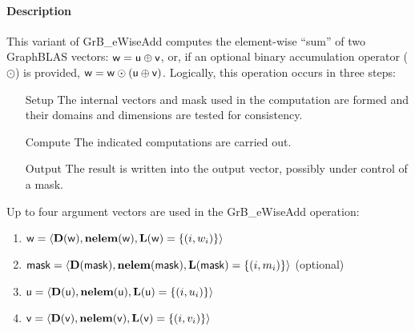 \paragraph{Description}

This variant of {\sf GrB\_eWiseAdd} computes the element-wise ``sum'' of
two GraphBLAS vectors: ${\sf w} = {\sf u} \oplus {\sf v}$, or, if an optional
binary accumulation operator ($\odot$) is provided, ${\sf w} = {\sf w} \odot
\left({\sf u} \oplus {\sf v}\right)$.  Logically, this operation occurs in
three steps:
\begin{enumerate}[leftmargin=0.75in]
\item[Setup] The internal vectors and mask used in the computation are formed 
and their domains and dimensions are tested for consistency.
\item[Compute] The indicated computations are carried out.
\item[Output] The result is written into the output vector, possibly under 
control of a mask.
\end{enumerate}

Up to four argument vectors are used in the {\sf GrB\_eWiseAdd} operation:
\begin{enumerate}
	\item ${\sf w} = \langle \bold{D}({\sf w}),\bold{nelem}({\sf w}),\bold{L}({\sf w}) = \{(i,w_i) \} \rangle$
	\item ${\sf mask} = \langle \bold{D}({\sf mask}),\bold{nelem}({\sf mask}),\bold{L}({\sf mask}) = \{(i,m_i) \} \rangle$ (optional)
	\item ${\sf u} = \langle \bold{D}({\sf u}),\bold{nelem}({\sf u}),\bold{L}({\sf u}) = \{(i,u_i) \} \rangle$
	\item ${\sf v} = \langle \bold{D}({\sf v}),\bold{nelem}({\sf v}),\bold{L}({\sf v}) = \{(i,v_i) \} \rangle$
\end{enumerate}

